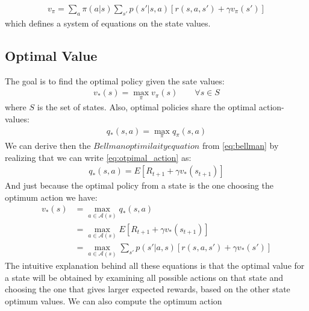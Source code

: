 \documentclass{article}
\begin{document}
\begin{align}
v_{\pi} =  \sum_{a}\pi(a|s) \sum_{s'} p(s' | s,a) \left[ r(s,a,s') + \gamma v_{\pi}(s') \right]
\end{align}
which defines a system of equations on the state values.

\subsection{Optimal Value}
The goal is to find the optimal policy given the sate values:
\begin{align}
    v_*(s) = \max_\pi v_\pi (s) \qquad \forall s \in S
\end{align}
where $S$ is the set of states. Also, optimal policies share the optimal action-values:
\begin{align}
    q_*(s,a) = \max_\pi q_\pi (s, a)
    \label{eq:optimal_action}
\end{align}
We can derive then the $Bellman optimilaity equation$ from \eqref{eq:bellman} by realizing that we can write \eqref{eq:otpimal_action} as:
\begin{align}
    q_*(s,a) = E\left[R_{t+1} + \gamma v_*(s_{t+1})\right]
\end{align}
And just because the optimal policy from a state is the one choosing the optimum action we have:
\begin{align}
    v_*(s) &= \max_{a \in \mathcal{A}(s)} q_*(s,a) \\
    &= \max_{a \in \mathcal{A}(s)} E\left[R_{t+1} + \gamma v_*(s_{t+1})\right] \\
    &= \max_{a \in \mathcal{A}(s)} \sum_{s'} p(s'|a,s)\left[r(s,a,s') + \gamma v_*(s')\right]
\end{align}
The intuitive explanation behind all these equations is that the optimal value for a state will be obtained by examining all possible actions on that state and choosing the one that gives larger expected rewards, based on the other state optimum values. We can also compute the optimum action
\end{document}
